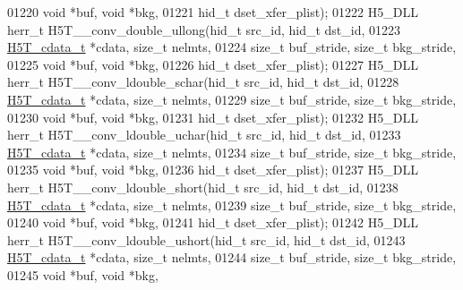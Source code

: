 \begin{DoxyCode}
01220                                      \textcolor{keywordtype}{void} *buf, \textcolor{keywordtype}{void} *bkg,
01221                                      hid\_t dset\_xfer\_plist);
01222 H5\_DLL herr\_t H5T\_\_conv\_double\_ullong(hid\_t src\_id, hid\_t dst\_id,
01223                      \hyperlink{struct_h5_t__cdata__t}{H5T\_cdata\_t} *cdata, \textcolor{keywordtype}{size\_t} nelmts,
01224                      \textcolor{keywordtype}{size\_t} buf\_stride, \textcolor{keywordtype}{size\_t} bkg\_stride,
01225                                      \textcolor{keywordtype}{void} *buf, \textcolor{keywordtype}{void} *bkg,
01226                                      hid\_t dset\_xfer\_plist);
01227 H5\_DLL herr\_t H5T\_\_conv\_ldouble\_schar(hid\_t src\_id, hid\_t dst\_id,
01228                      \hyperlink{struct_h5_t__cdata__t}{H5T\_cdata\_t} *cdata, \textcolor{keywordtype}{size\_t} nelmts,
01229                      \textcolor{keywordtype}{size\_t} buf\_stride, \textcolor{keywordtype}{size\_t} bkg\_stride,
01230                                      \textcolor{keywordtype}{void} *buf, \textcolor{keywordtype}{void} *bkg,
01231                                      hid\_t dset\_xfer\_plist);
01232 H5\_DLL herr\_t H5T\_\_conv\_ldouble\_uchar(hid\_t src\_id, hid\_t dst\_id,
01233                      \hyperlink{struct_h5_t__cdata__t}{H5T\_cdata\_t} *cdata, \textcolor{keywordtype}{size\_t} nelmts,
01234                      \textcolor{keywordtype}{size\_t} buf\_stride, \textcolor{keywordtype}{size\_t} bkg\_stride,
01235                                      \textcolor{keywordtype}{void} *buf, \textcolor{keywordtype}{void} *bkg,
01236                                      hid\_t dset\_xfer\_plist);
01237 H5\_DLL herr\_t H5T\_\_conv\_ldouble\_short(hid\_t src\_id, hid\_t dst\_id,
01238                      \hyperlink{struct_h5_t__cdata__t}{H5T\_cdata\_t} *cdata, \textcolor{keywordtype}{size\_t} nelmts,
01239                      \textcolor{keywordtype}{size\_t} buf\_stride, \textcolor{keywordtype}{size\_t} bkg\_stride,
01240                                      \textcolor{keywordtype}{void} *buf, \textcolor{keywordtype}{void} *bkg,
01241                                      hid\_t dset\_xfer\_plist);
01242 H5\_DLL herr\_t H5T\_\_conv\_ldouble\_ushort(hid\_t src\_id, hid\_t dst\_id,
01243                      \hyperlink{struct_h5_t__cdata__t}{H5T\_cdata\_t} *cdata, \textcolor{keywordtype}{size\_t} nelmts,
01244                      \textcolor{keywordtype}{size\_t} buf\_stride, \textcolor{keywordtype}{size\_t} bkg\_stride,
01245                                      \textcolor{keywordtype}{void} *buf, \textcolor{keywordtype}{void} *bkg,

\end{DoxyCode}
